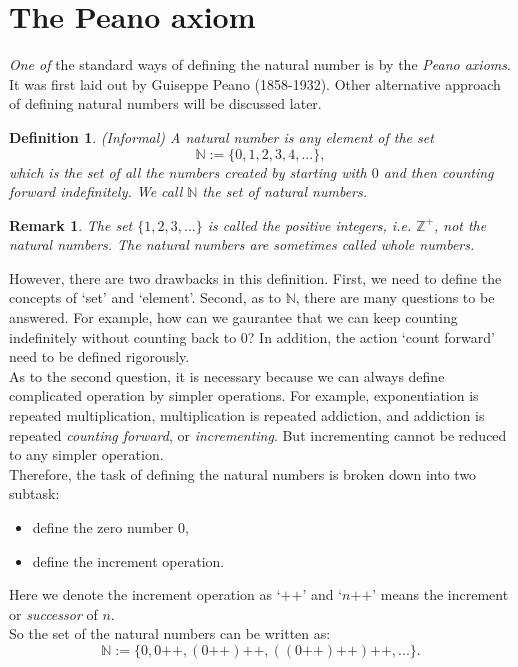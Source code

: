 \documentclass[a4paper,oneside]{book}
\newtheorem{definition}{Definition}[section]
\newtheorem{remark}{Remark}[section]
\begin{document}
		\section{The Peano axiom}
			\textit{One of} the standard ways of defining the natural number is by the \textit{Peano axioms}. It was first laid out by Guiseppe Peano (1858-1932). Other alternative approach of defining natural numbers will be discussed later.
			\begin{definition}
				(Informal) A \textit{natural number} is any element of the set $$\mathbb{N} := \{0,1,2,3,4,...\},$$ which is the set of all the numbers created by starting with $0$ and then counting forward indefinitely. We call $\mathbb{N}$ the \textit{set of natural numbers}.
			\end{definition}
			\begin{remark}
				The set $\{1,2,3,...\}$ is called \textit{the positive integers}, i.e. ${\mathbb{Z}}^{+}$, not the natural numbers. The natural numbers are sometimes called \textit{whole numbers}.
			\end{remark}
			However, there are two drawbacks in this definition. First, we need to define the concepts of `set' and `element'. Second, as to $\mathbb{N}$, there are many questions to be answered. For example, how can we gaurantee that we can keep counting indefinitely without counting back to $0$? In addition, the action `count forward' need to be defined rigorously.\\
			As to the second question, it is necessary because we can always define complicated operation by simpler operations. For example, exponentiation is repeated multiplication, multiplication is repeated addiction, and addiction is repeated \textit{counting forward}, or \textit{incrementing}. But incrementing cannot be reduced to any simpler operation.\\
			Therefore, the task of defining the natural numbers is broken down into two subtask:
			\begin{itemize}
				\item define the zero number $0$,
				\item define the increment operation.
			\end{itemize}
			Here we denote the increment operation as `$\texttt{++}$' and `$n\texttt{++}$' means the increment or \textit{successor} of $n$.\\
			So the set of the natural numbers can be written as:
			\begin{equation*}
				\mathbb{N} := \{0,0\texttt{++},(0\texttt{++})\texttt{++},((0\texttt{++})\texttt{++})\texttt{++},...\}.
			\end{equation*}
\end{document}
